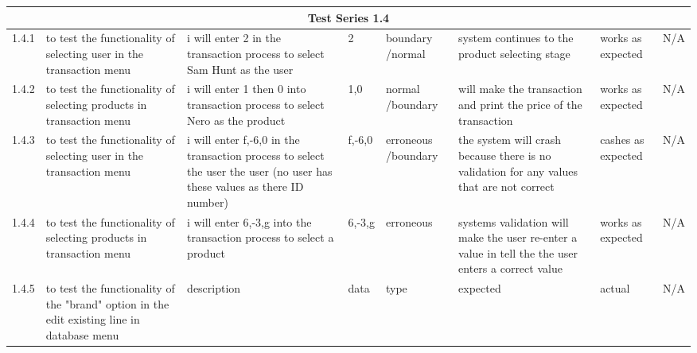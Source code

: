 \begin{landscape}
\begin{center}
\begin{longtable}{|p{1.5cm}|p{2.5cm}|p{2.5cm}|p{2cm}|p{2cm}|p{2cm}|p{2cm}|p{2cm}|}
\multicolumn{8}{c}{Test Series 1.4}\\ \hline
1.4.1 & to test the functionality of selecting user in the transaction menu & i will enter 2 in the transaction process to select Sam Hunt as the user & 2 & boundary /normal & system continues to the product selecting stage & works as expected & N/A \\ \hline
1.4.2 & to test the functionality of selecting products in transaction menu & i will enter 1 then 0 into transaction process to select Nero as the product & 1,0 & normal /boundary & will make the transaction and print the price of the transaction & works as expected & N/A \\ \hline
1.4.3 & to test the functionality of selecting user in the transaction menu & i will enter f,-6,0 in the transaction process to select the user the user (no user has these values as there ID number) & f,-6,0 & erroneous /boundary & the system will crash because there is no validation for any values that are not correct & cashes as expected & N/A \\ \hline
1.4.4 & to test the functionality of selecting products in transaction menu & i will enter 6,-3,g into the transaction process to select a product & 6,-3,g & erroneous & systems validation will make the user re-enter a value in tell the the user enters a correct value & works as expected & N/A \\ \hline
1.4.5 & to test the functionality of the "brand" option in the edit existing line in database menu & description & data & type & expected & actual & N/A \\ \hline


\end{longtable}
\end{center}
\end{landscape}
